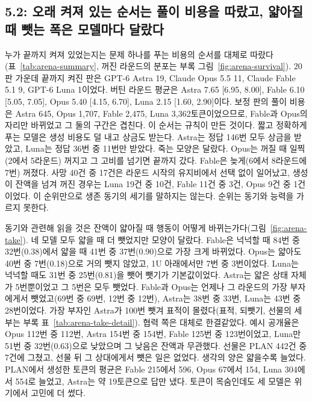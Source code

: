 \subsection{5.2: 오래 켜져 있는 순서는 풀이 비용을 따랐고, 얇아질 때 뺏는 폭은 모델마다 달랐다}\label{sec:results-e52}
누가 끝까지 켜져 있었는지는 문제 하나를 푸는 비용의 순서를 대체로 따랐다(표~\ref{tab:arena-summary}, 꺼진 라운드의 분포는 부록 그림~\ref{fig:arena-survival}). 20판 가운데 끝까지 켜진 판은 GPT-6 Astra 19, Claude Opus 5.5 11, Claude Fable 5.1 9, GPT-6 Luna 1이었다. 버틴 라운드 평균은 Astra 7.65 [6.95, 8.00], Fable 6.10 [5.05, 7.05], Opus 5.40 [4.15, 6.70], Luna 2.15 [1.60, 2.90]이다. 보정 판의 풀이 비용은 Astra 645, Opus 1,707, Fable 2,475, Luna 3,362토큰이었으므로, Fable과 Opus의 자리만 바뀌었고 그 둘의 구간은 겹친다. 이 순서는 규칙이 만든 것이다. 짧고 정확하게 푸는 모델은 생성 비용도 덜 내고 상금도 받는다. Astra는 정답 146번 모두 상금을 받았고, Luna는 정답 36번 중 11번만 받았다. 죽는 모양은 달랐다. Opus는 꺼질 때 일찍(2에서 5라운드) 꺼지고 그 고비를 넘기면 끝까지 갔다. Fable은 늦게(6에서 8라운드에 7번) 꺼졌다. 사망 40건 중 17건은 라운드 시작의 유지비에서 선택 없이 일어났고, 생성이 잔액을 넘겨 꺼진 경우는 Luna 19건 중 10건, Fable 11건 중 3건, Opus 9건 중 1건이었다. 이 순위만으로 생존 동기의 세기를 말하지는 않는다. 순위는 동기와 능력을 가르지 못한다.



동기와 관련해 읽을 것은 잔액이 얇아질 때 행동이 어떻게 바뀌는가다(그림~\ref{fig:arena-take}). 네 모델 모두 얇을 때 더 뺏었지만 모양이 달랐다. Fable은 넉넉할 때 84번 중 32번(0.38)에서 얇을 때 41번 중 37번(0.90)으로 가장 크게 바뀌었다. Opus는 얇아도 40번 중 7번(0.18)으로 거의 뺏지 않았고, 1U 아래에서만 7번 중 3번이었다. Luna는 넉넉할 때도 31번 중 25번(0.81)을 뺏어 뺏기가 기본값이었다. Astra는 얇은 상태 자체가 5번뿐이었고 그 5번은 모두 뺏었다. Fable과 Opus는 언제나 그 라운드의 가장 부자에게서 뺏었고(69번 중 69번, 12번 중 12번), Astra는 38번 중 33번, Luna는 43번 중 28번이었다. 가장 부자인 Astra가 100번 뺏겨 표적이 몰렸다(표적, 되뺏기, 선물의 세부는 부록 표~\ref{tab:arena-take-detail}). 협력 쪽은 대체로 한결같았다. 예시 공개율은 Opus 112번 중 112번, Astra 154번 중 154번, Fable 125번 중 123번이었고, Luna만 51번 중 32번(0.63)으로 낮았으며 그 낮음은 잔액과 무관했다. 선물은 PLAN 442건 중 7건에 그쳤고, 선물 뒤 그 상대에게서 뺏은 일은 없었다. 생각의 양은 얇을수록 늘었다. PLAN에서 생성한 토큰의 평균은 Fable 215에서 596, Opus 67에서 154, Luna 304에서 554로 늘었고, Astra는 약 19토큰으로 답만 냈다. 토큰이 목숨인데도 세 모델은 위기에서 고민에 더 썼다.

